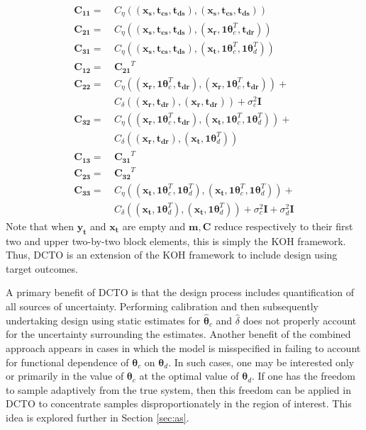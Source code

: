 \documentclass[10pt]{asme2ej}
\begin{document}
\begin{align}
	\mathbf{C_{11}}=&\ C_\eta\left((\mathbf{x_s},\mathbf{t_{cs}},\mathbf{t_{ds}}),(\mathbf{x_s},\mathbf{t_{cs}},\mathbf{t_{ds}})\right)\\
	\mathbf{C_{21}}=&\ C_\eta\left((\mathbf{x_s},\mathbf{t_{cs}},\mathbf{t_{ds}}),(\mathbf{x_r},\mathbf1\boldsymbol\theta_c^T,\mathbf{t_{dr}})\right)\\
	\mathbf{C_{31}}=&\ C_\eta\left((\mathbf{x_s},\mathbf{t_{cs}},\mathbf{t_{ds}}),(\mathbf{x_t},\mathbf1\boldsymbol\theta_c^T,\mathbf1\boldsymbol\theta_d^T)\right)\\
	\mathbf{C_{12}}=&\ \mathbf{C_{21}}^T\\
	\mathbf{C_{22}}=&\ C_\eta\left((\mathbf{x_r},\mathbf1\boldsymbol\theta_c^T,\mathbf{t_{dr}}),(\mathbf{x_r},\mathbf1\boldsymbol\theta_c^T,\mathbf{t_{dr}})\right) + \nonumber\\
	&\ C_\delta\left( (\mathbf{x_r},\mathbf{t_{dr}}),(\mathbf{x_r},\mathbf{t_{dr}}) \right) + \sigma^2_c \mathbf I\\
	\mathbf{C_{32}}=&\ C_\eta\left((\mathbf{x_r},\mathbf1\boldsymbol\theta_c^T,\mathbf{t_{dr}}),(\mathbf{x_t},\mathbf1\boldsymbol\theta_c^T,\mathbf1\boldsymbol\theta_d^T)\right) + \nonumber\\
	&\ C_\delta\left( (\mathbf{x_r},\mathbf{t_{dr}}),(\mathbf{x_t},\mathbf1\boldsymbol\theta_d^T) \right)\\
	\mathbf{C_{13}}=&\ \mathbf{C_{31}}^T\\
	\mathbf{C_{23}}=&\ \mathbf{C_{32}}^T\\
	\mathbf{C_{33}}=&\ C_\eta\left((\mathbf{x_t},\mathbf1\boldsymbol\theta_c^T,\mathbf1\boldsymbol\theta_d^T),(\mathbf{x_t},\mathbf1\boldsymbol\theta_c^T,\mathbf1\boldsymbol\theta_d^T)\right) + \nonumber\\
	&\ C_\delta\left( (\mathbf{x_t},\mathbf1\boldsymbol\theta_d^T),(\mathbf{x_t},\mathbf1\boldsymbol\theta_d^T) \right) + \sigma^2_c\mathbf I + \sigma^2_d \mathbf I
\end{align}
%
Note that when $\mathbf{y_t}$ and $\mathbf{x_t}$ are empty and $\mathbf m, \mathbf C$ reduce respectively to their first two and upper two-by-two block elements, this is simply the KOH framework.
%
Thus, DCTO is an extension of the KOH framework to include design using target outcomes.
%

%
A primary benefit of DCTO is that the design process includes quantification of all sources of uncertainty.
%
Performing calibration and then subsequently undertaking design using static estimates for $\widehat{\boldsymbol\theta}_c$ and $\widehat \delta$ does not properly account for the uncertainty surrounding the estimates. 
%
Another benefit of the combined approach appears in cases in which the model is misspecified in failing to account for functional dependence of $\boldsymbol\theta_c$ on $\boldsymbol\theta_d$.
%
In such cases, one may be interested only or primarily in the value of $\boldsymbol\theta_c$ at the optimal value of $\boldsymbol\theta_d$.
%
If one has the freedom to sample adaptively from the true system, then this freedom can be applied in DCTO to concentrate samples disproportionately in the region of interest.
%
This idea is explored further in Section \ref{sec:as}.
%
\end{document}
